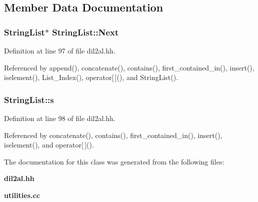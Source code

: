 \subsection{Member Data Documentation}
\subsubsection{\setlength{\rightskip}{0pt plus 5cm}String\-List$\ast$ String\-List::Next\hspace{0.3cm}{\tt  [protected]}}\label{classStringList_n0}




Definition at line 97 of file dil2al.hh.

Referenced by append(), concatenate(), contains(), first\_\-contained\_\-in(), insert(), iselement(), List\_\-Index(), operator[$\,$](), and String\-List().
\subsubsection{ String\-List::s\hspace{0.3cm}{\tt  [protected]}}\label{classStringList_n1}




Definition at line 98 of file dil2al.hh.

Referenced by concatenate(), contains(), first\_\-contained\_\-in(), insert(), iselement(), and operator[$\,$]().

The documentation for this class was generated from the following files:\begin{CompactItemize}
\item 
{\bf dil2al.hh}\item 
{\bf utilities.cc}\end{CompactItemize}
